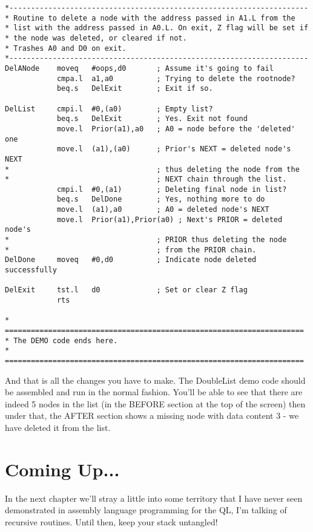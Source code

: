 \begin{lstlisting}[firstnumber=232,caption={Doubly Linked List - Demo Code - Deleting A Node}]
*---------------------------------------------------------------------
* Routine to delete a node with the address passed in A1.L from the
* list with the address passed in A0.L. On exit, Z flag will be set if
* the node was deleted, or cleared if not.
* Trashes A0 and D0 on exit.
*---------------------------------------------------------------------
DelANode    moveq   #oops,d0       ; Assume it's going to fail
            cmpa.l  a1,a0          ; Trying to delete the rootnode?
            beq.s   DelExit        ; Exit if so.

DelList     cmpi.l  #0,(a0)        ; Empty list?
            beq.s   DelExit        ; Yes. Exit not found
            move.l  Prior(a1),a0   ; A0 = node before the 'deleted' one
            move.l  (a1),(a0)      ; Prior's NEXT = deleted node's NEXT
*                                  ; thus deleting the node from the
*                                  ; NEXT chain through the list.
            cmpi.l  #0,(a1)        ; Deleting final node in list?
            beq.s   DelDone        ; Yes, nothing more to do
            move.l  (a1),a0        ; A0 = deleted node's NEXT
            move.l  Prior(a1),Prior(a0) ; Next's PRIOR = deleted node's
*                                  ; PRIOR thus deleting the node
*                                  ; from the PRIOR chain.
DelDone     moveq   #0,d0          ; Indicate node deleted successfully

DelExit     tst.l   d0             ; Set or clear Z flag
            rts

* =====================================================================
* The DEMO code ends here.
* =====================================================================
\end{lstlisting}

And that is all the changes you have to make. The DoubleList demo code should be
assembled and run in the normal fashion. You'll be able to see that there are indeed 5
nodes in the list (in the BEFORE section at the top of the screen) then under that, the
AFTER section shows a missing node with data content 3 -{} we have deleted it from the
list.

\section{Coming Up...}
\label{ch12-the-end}%

In the next chapter we'll stray a little into some territory that I have never
    seen demonstrated in assembly language programming for the QL, I'm talking
    of recursive routines. Until then, keep your stack untangled! 

